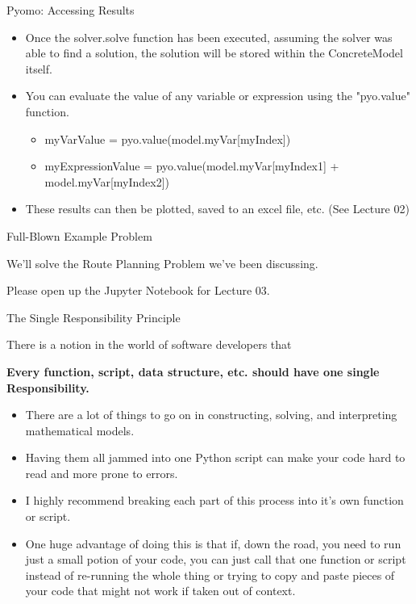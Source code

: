 \documentclass[10pt, aspectratio=169]{beamer}
\begin{document}
\begin{frame}{Pyomo: Accessing Results}
    \begin{itemize}
        \item Once the solver.solve function has been executed, assuming the solver was able to find a solution, the solution will be stored within the ConcreteModel itself.
        \item You can evaluate the value of any variable or expression using the "pyo.value" function.
        \begin{itemize}
            \item myVarValue = pyo.value(model.myVar[myIndex])
            \item myExpressionValue = pyo.value(model.myVar[myIndex1] + model.myVar[myIndex2])
        \end{itemize}
        \item These results can then be plotted, saved to an excel file, etc. (See Lecture 02)
    \end{itemize}
\end{frame}

\begin{frame}{Full-Blown Example Problem}
    \begin{center}
        We'll solve the Route Planning Problem we've been discussing.

        \vspace{1 cm}

        Please open up the Jupyter Notebook for Lecture 03.
    \end{center}
    
\end{frame}

\begin{frame}{The Single Responsibility Principle}
    \begin{center}
        There is a notion in the world of software developers that

        \textbf{Every function, script, data structure, etc. should have one single Responsibility.}
    \end{center}
    \begin{itemize}
        \item There are a lot of things to go on in constructing, solving, and interpreting mathematical models.
        \item Having them all jammed into one Python script can make your code hard to read and more prone to errors.
        \item I highly recommend breaking each part of this process into it's own function or script.
        \item One huge advantage of doing this is that if, down the road, you need to run just a small potion of your code, you can just call that one function or script instead of re-running the whole thing or trying to copy and paste pieces of your code that might not work if taken out of context.
    \end{itemize}
\end{frame}
\end{document}
